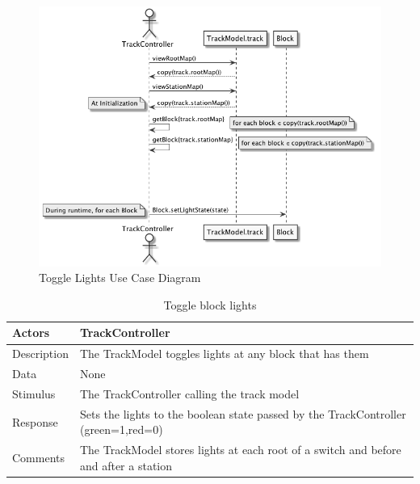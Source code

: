 \documentclass[]{article}
\begin{document}
\begin{figure}[H]
	\centering
	\includegraphics[scale=.5]{lights.png}
	\caption{Toggle Lights Use Case Diagram}
\end{figure}
\begin{table}[H]
	\centering
	\caption{Toggle block lights}
	\begin{tabular}{|l|l|}
		\hline
		Actors & \parbox[t]{10cm}{TrackController} \\ \hline
		Description & \parbox[t]{10cm}{The TrackModel toggles lights at any block that has them} \\ \hline
		Data &  \parbox[t]{10cm}{None} \\ \hline
		Stimulus &  \parbox[t]{10cm}{The TrackController calling the track model} \\ \hline
		Response & \parbox[t]{10cm}{Sets the lights to the boolean state passed by the TrackController (green=1,red=0)}\\ \hline
		Comments & \parbox[t]{10cm}{The TrackModel stores lights at each root of a switch and before and after a station}  \\ \hline
	\end{tabular}
\end{table}
\end{document}
